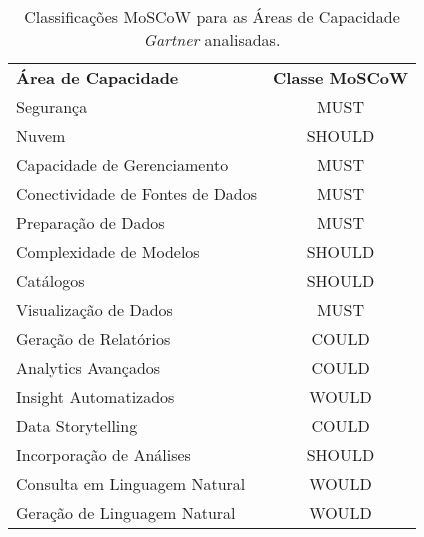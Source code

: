 \begin{table}[!h]
    \begin{center}
    \begin{tabular}{|p{}|c|}
        \hline
            \rowcolor{cldfB1} \multicolumn{2}{|c|}{\Large Áreas de Capacidade \emph{Gartner} \normalsize} \\ \hline \hline
            \rowcolor{lightgray}\textbf{Área de Capacidade} & \textbf{Classe MoSCoW} \\ \hline
            \rowcolor{corMUST!80}Segurança & MUST \\ \hline
            \rowcolor{corSHOULD!80}Nuvem & SHOULD \\ \hline
            \rowcolor{corMUST!80}Capacidade de Gerenciamento & MUST \\ \hline
            \rowcolor{corMUST!80}Conectividade de Fontes de Dados & MUST \\ \hline
            \rowcolor{corMUST!80}Preparação de Dados & MUST \\ \hline
            \rowcolor{corSHOULD!80}Complexidade de Modelos & SHOULD \\ \hline
            \rowcolor{corSHOULD!80}Catálogos & SHOULD \\ \hline
            \rowcolor{corMUST!80}Visualização de Dados & MUST \\ \hline
            \rowcolor{corCOULD!50}Geração de Relatórios & COULD \\ \hline
            \rowcolor{corCOULD!50}Analytics Avançados & COULD \\ \hline
            \rowcolor{corWOULD!50}Insight Automatizados & WOULD \\ \hline
            \rowcolor{corCOULD!50}Data Storytelling & COULD \\ \hline
            \rowcolor{corSHOULD!80}Incorporação de Análises & SHOULD \\ \hline
            \rowcolor{corWOULD!50}Consulta em Linguagem Natural & WOULD \\ \hline
            \rowcolor{corWOULD!50}Geração de Linguagem Natural & WOULD \\ \hline
    \end{tabular}    
    \caption{\label{tab:moscow} Classificações MoSCoW para as Áreas de Capacidade \emph{Gartner} analisadas.}
    \end{center}
\end{table}


